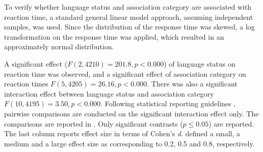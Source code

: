 \documentclass[output=paper,colorlinks,citecolor=brown,nonflat]{langsci/langscibook}
\begin{document}
To verify whether language status and association category are associated with reaction time, a standard general linear model approach, assuming independent samples, was used. Since the distribution of the response time was skewed, a log transformation on the response time was applied, which resulted in an approximately normal distribution.

A significant effect ($F(2, 4210) = 201.8, p < 0.000$) of language status on reaction time was observed, and a significant effect of association category on reaction times $F(5, 4205) = 26.16, p < 0.000$. There was also a significant interaction effect between language status and association category $F(10, 4195) = 3.50, p < 0.000$. Following statistical reporting guidelines \citep{FieldEtAl2012}, pairwise comparisons are conducted on the significant interaction effect only. The comparisons are reported in . Only significant contrasts ($p \leq 0.05$) are reported. The last column reports effect size in terms of Cohen’s \textit{d}. \citet{Cohen1988} defined a small, a medium and a large effect size as corresponding to 0.2, 0.5 and 0.8, respectively.
\end{document}
